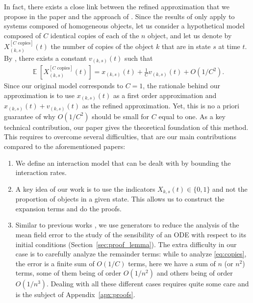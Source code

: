 \documentclass[acmsmall]{acmart}
\newcommand{\ncopies}{^{[C\text{ copies}]}}
\DeclareMathOperator{\E}{\mathbb{E}} %
\newcommand\esp[1]{\E\left[#1\right]} %
\begin{document}
In fact, there exists a close link between the refined approximation that we propose in the paper and the approach of \cite{gastSizeExpansionsMean2019,gastRefinedMeanField2017}. Since the results of \cite{gastSizeExpansionsMean2019,gastRefinedMeanField2017} only apply to systems composed of homogeneous objects, let us consider a hypothetical model composed of $C$ identical copies of each of the $n$ object, and let us denote by $X_{(k,s)}\ncopies(t)$ the number of copies of the object $k$ that are in state $s$ at time $t$. By \cite{gastSizeExpansionsMean2019,gastRefinedMeanField2017}, there exists a constant $v_{(k,s)}(t)$ such that 
\begin{align}
  \label{eq:copies}
  \esp{X_{(k,s)}\ncopies(t)} = x_{(k,s)}(t) + \frac1C v_{(k,s)}(t) + O(1/C^2).
\end{align}
Since our original model corresponds to $C=1$, the rationale behind our approximation is to use $x_{(k,s)}(t)$ as a first order approximation and $x_{(k,s)}(t) + v_{(k,s)}(t)$ as the refined approximation. Yet, this is no a priori guarantee of why $O(1/C^2)$ should be small for $C$ equal to one. As a key technical contribution, our paper gives the theoretical foundation of this method. This requires to overcome several difficulties, that are our main contributions compared to the aforementioned papers:
\begin{enumerate}%
  \item We define an interaction model that can be dealt with by bounding the interaction rates. 
  \item A key idea of our work is to use the indicators $X_{k,s}(t)\in\{0,1\}$ and not the proportion of objects in a given state. This allows us to construct the expansion terms and do the proofs.
  \item Similar to previous works \cite{gast2017expected,kolokoltsovMeanFieldGames2012,ying2015rate}, we use generators to reduce the analysis of the mean field error to the study of the sensibility of an ODE with respect to its initial conditions (Section~\ref{sec:proof_lemma}). The extra difficulty in our case is to carefully analyze the remainder terms: while to analyze \eqref{eq:copies}, the error is a finite sum of $O(1/C)$ terms, here we have a sum of $n$ (or $n^2$) terms, some of them being of order $O(1/n^2)$ and others being of order $O(1/n^3)$. Dealing with all these different cases requires quite some care and is the subject of Appendix~\ref{apx:proofs}.
\end{enumerate}
\end{document}
